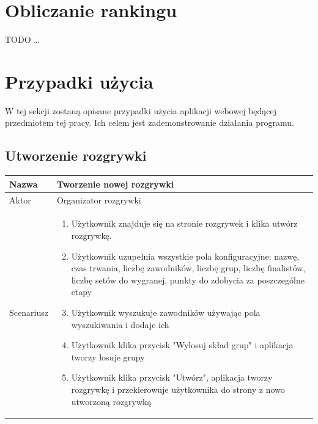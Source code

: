 \documentclass[shortabstract]{iithesis}
\begin{document}
\section{Obliczanie rankingu}
TODO \ldots

\section{Przypadki użycia}
W tej sekcji zostaną opisane przypadki użycia aplikacji webowej będącej przedmiotem tej pracy.
Ich celem jest zademonstrowanie działania programu.
\subsection{Utworzenie rozgrywki}


\begin{tabular}{|l|p{12cm}|}
    \hline
    Nazwa      & Tworzenie nowej rozgrywki                                                                                                                                                              \\
    \hline
    Aktor      & Organizator rozgrywki                                                                                                                                                                  \\
    \hline
    Scenariusz &
    \begin{enumerate}[nosep,leftmargin=*,rightmargin=8pt,before=\vspace{-7.5pt},after=\vspace{-8pt}]
        \item Użytkownik znajduje się na stronie rozgrywek i klika utwórz rozgrywkę.
        \item Użytkownik uzupełnia wszystkie pola konfiguracyjne: nazwę, czas trwania, liczbę zawodników, liczbę grup, liczbę finalistów, liczbę setów do wygranej, punkty do zdobycia za poszczególne etapy
        \item Użytkownik wyszukuje zawodników używając pola wyszukiwania i dodaje ich
        \item Użytkownik klika przycisk "Wylosuj skład grup" i aplikacja tworzy losuje grupy
        \item Użytkownik klika przycisk "Utwórz", aplikacja tworzy rozgrywkę i przekierowuje użytkownika do strony z nowo utworzoną rozgrywką
    \end{enumerate} \\
    \hline
\end{tabular}
\end{document}
